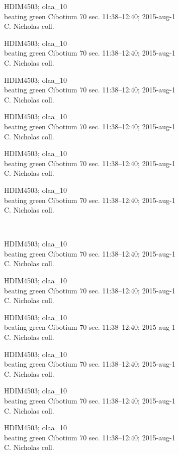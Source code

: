 \documentclass[2pt]{extarticle}
\begin{document}
\noindent
\parbox{0.16\textwidth}{\tiny \raggedright \rule[-0.3\baselineskip]{0pt}{10pt}HDIM4503; olaa\_10\\ beating green Cibotium 70 sec. 11:38--12:40; 2015-aug-1\\ C. Nicholas coll.}
\parbox{0.16\textwidth}{\tiny \raggedright \rule[-0.3\baselineskip]{0pt}{10pt}HDIM4503; olaa\_10\\ beating green Cibotium 70 sec. 11:38--12:40; 2015-aug-1\\ C. Nicholas coll.}
\parbox{0.16\textwidth}{\tiny \raggedright \rule[-0.3\baselineskip]{0pt}{10pt}HDIM4503; olaa\_10\\ beating green Cibotium 70 sec. 11:38--12:40; 2015-aug-1\\ C. Nicholas coll.}
\parbox{0.16\textwidth}{\tiny \raggedright \rule[-0.3\baselineskip]{0pt}{10pt}HDIM4503; olaa\_10\\ beating green Cibotium 70 sec. 11:38--12:40; 2015-aug-1\\ C. Nicholas coll.}
\parbox{0.16\textwidth}{\tiny \raggedright \rule[-0.3\baselineskip]{0pt}{10pt}HDIM4503; olaa\_10\\ beating green Cibotium 70 sec. 11:38--12:40; 2015-aug-1\\ C. Nicholas coll.}
\parbox{0.16\textwidth}{\tiny \raggedright \rule[-0.3\baselineskip]{0pt}{10pt}HDIM4503; olaa\_10\\ beating green Cibotium 70 sec. 11:38--12:40; 2015-aug-1\\ C. Nicholas coll.} \\ 
\vspace{0.001in} 

\noindent
\parbox{0.16\textwidth}{\tiny \raggedright \rule[-0.3\baselineskip]{0pt}{10pt}HDIM4503; olaa\_10\\ beating green Cibotium 70 sec. 11:38--12:40; 2015-aug-1\\ C. Nicholas coll.}
\parbox{0.16\textwidth}{\tiny \raggedright \rule[-0.3\baselineskip]{0pt}{10pt}HDIM4503; olaa\_10\\ beating green Cibotium 70 sec. 11:38--12:40; 2015-aug-1\\ C. Nicholas coll.}
\parbox{0.16\textwidth}{\tiny \raggedright \rule[-0.3\baselineskip]{0pt}{10pt}HDIM4503; olaa\_10\\ beating green Cibotium 70 sec. 11:38--12:40; 2015-aug-1\\ C. Nicholas coll.}
\parbox{0.16\textwidth}{\tiny \raggedright \rule[-0.3\baselineskip]{0pt}{10pt}HDIM4503; olaa\_10\\ beating green Cibotium 70 sec. 11:38--12:40; 2015-aug-1\\ C. Nicholas coll.}
\parbox{0.16\textwidth}{\tiny \raggedright \rule[-0.3\baselineskip]{0pt}{10pt}HDIM4503; olaa\_10\\ beating green Cibotium 70 sec. 11:38--12:40; 2015-aug-1\\ C. Nicholas coll.}
\parbox{0.16\textwidth}{\tiny \raggedright \rule[-0.3\baselineskip]{0pt}{10pt}HDIM4503; olaa\_10\\ beating green Cibotium 70 sec. 11:38--12:40; 2015-aug-1\\ C. Nicholas coll.} \\ 
\vspace{0.001in} 
\end{document}
